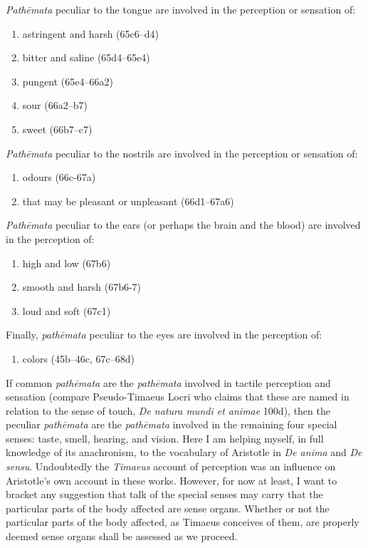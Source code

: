 \emph{Pathēmata} peculiar to the tongue are involved in the perception or sensation of:
\begin{enumerate}[(1)]
	\item astringent and harsh (65c6--d4)
	\item bitter and saline (65d4--65e4)
	\item pungent (65e4--66a2)
	\item sour (66a2--b7)
	\item sweet (66b7--c7)
\end{enumerate}

\emph{Pathēmata} peculiar to the nostrils are involved in the perception or sensation of:
\begin{enumerate}[(1)]
	\item odours (66c-67a)
	\item that may be pleasant or unpleasant (66d1--67a6)
\end{enumerate}

\emph{Pathēmata} peculiar to the ears (or perhaps the brain and the blood) are involved in the perception of:
\begin{enumerate}[(1)]
	\item high and low (67b6)
	\item smooth and harsh (67b6-7)
	\item loud and soft (67c1)
\end{enumerate}

Finally, \emph{pathēmata} peculiar to the eyes are involved in the perception of:
\begin{enumerate}[(1)]
	\item colors (45b--46c, 67c--68d)
\end{enumerate}

If common \emph{pathēmata} are the \emph{pathēmata} involved in tactile perception and sensation (compare Pseudo-Timaeus Locri who claims that these are named in relation to the sense of touch, \emph{De natura mundi et animae} 100d), then the peculiar \emph{pathēmata} are the \emph{pathēmata} involved in the remaining four special senses: taste, smell, hearing, and vision. Here I am helping myself, in full knowledge of its anachronism, to the vocabulary of Aristotle in \emph{De anima} and \emph{De sensu}. Undoubtedly the \emph{Timaeus} account of perception was an influence on Aristotle's own account in these works. However, for now at least, I want to bracket any suggestion that talk of the special senses may carry that the particular parts of the body affected are sense organs. Whether or not the particular parts of the body affected, as Timaeus conceives of them, are properly deemed sense organs shall be assessed as we proceed.

